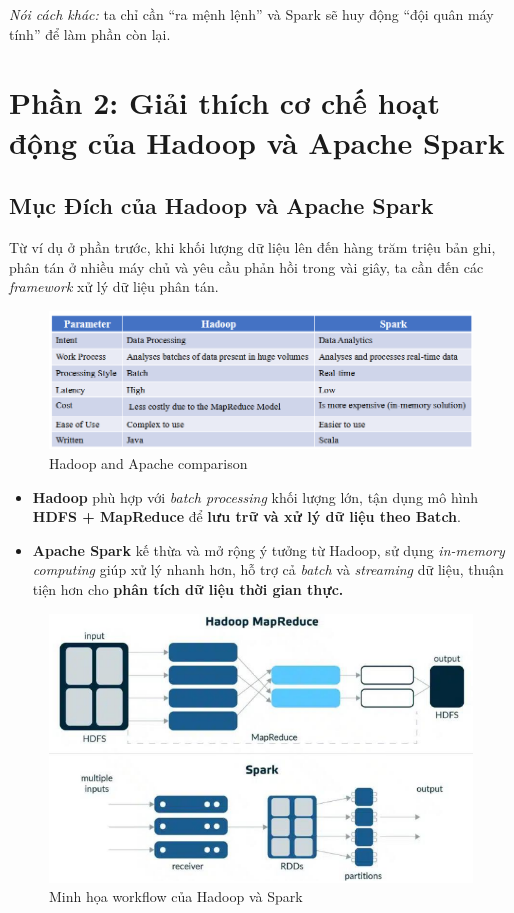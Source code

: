\documentclass[11pt]{article}
\begin{document}
\noindent\textit{Nói cách khác:} ta chỉ cần ``ra mệnh lệnh'' và Spark sẽ huy động ``đội quân máy tính'' để làm phần còn lại.


\section{Phần 2: Giải thích cơ chế hoạt động của Hadoop và Apache Spark}

\subsection{Mục Đích của Hadoop và Apache Spark}
Từ ví dụ ở phần trước, khi khối lượng dữ liệu lên đến hàng trăm triệu bản ghi, phân tán ở nhiều máy chủ và yêu cầu phản hồi trong vài giây, ta cần đến các \textit{framework} xử lý dữ liệu phân tán.
\begin{figure}[H]
    \centering
    \includegraphics[width=0.7\linewidth]{images/HadoopPysparkComparison.png}
    \caption{Hadoop and Apache comparison}
\end{figure}
\begin{itemize}
    \item \textbf{Hadoop} phù hợp với \textit{batch processing} khối lượng lớn, tận dụng mô hình \textbf{HDFS + MapReduce} để \textbf{lưu trữ và xử lý dữ liệu theo Batch}.
    \item \textbf{Apache Spark} kế thừa và mở rộng ý tưởng từ Hadoop, sử dụng \textit{in-memory computing} giúp xử lý nhanh hơn, hỗ trợ cả \textit{batch} và \textit{streaming} dữ liệu, thuận tiện hơn cho \textbf{phân tích dữ liệu thời gian thực.}
\end{itemize}

\begin{figure}[H]
    \centering
    \includegraphics[width=0.7\linewidth]{images/hd_vs_sp.png}
    \caption{Minh họa workflow của Hadoop và Spark}
\end{figure}
\end{document}
